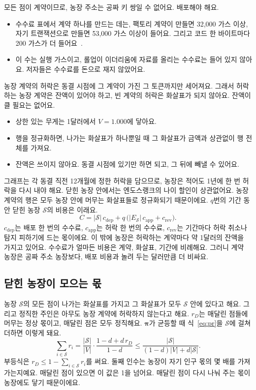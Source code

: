 모든 점이 계약이므로, 농장 주소는 공짜 키 쌍일 수 없어요. 배포해야 해요.
\begin{itemize}
\item 수수료 표에서 계약 하나를 만드는 데는, 팩토리 계약이 만들면 32,000 가스 이상, 자기 트랜잭션으로 만들면 53,000 가스 이상이 들어요. 그리고 코드 한 바이트마다 200 가스가 더 들어요~\cite{wood2025yellowpaper}.
\item 이 수는 실행 가스이고, 롤업이 이더리움에 자료를 올리는 수수료는 들어 있지 않아요. 저자들은 수수료를 돈으로 재지 않았어요.
\end{itemize}
농장 계약의 허락은 동결 시점에 그 계약이 가진 그 토큰까지만 세어져요. 그래서 허락하는 농장 계약은 잔액이 있어야 하고, 빈 계약의 허락은 화살표가 되지 않아요. 잔액이 클 필요는 없어요.
\begin{itemize}
\item 상한 있는 무게는 1달러에서 $V=1.000$에 닿아요.
\item 행을 정규화하면, 나가는 화살표가 하나뿐일 때 그 화살표가 금액과 상관없이 행 전체를 가져요.
\item 잔액은 쓰이지 않아요. 동결 시점에 있기만 하면 되고, 그 뒤에 빼낼 수 있어요.
\end{itemize}
그래프는 각 동결 직전 12개월에 정한 허락을 담으므로, 농장은 적어도 1년에 한 번 허락을 다시 내야 해요. 닫힌 농장 안에서는 엔도스랭크의 나이 할인이 상관없어요. 농장 계약의 행은 모두 농장 안에 머무는 화살표들로 정규화되기 때문이에요. $q$번의 기간 동안 닫힌 농장 $\mathcal S$의 비용은 이래요.
\begin{equation}
C=|\mathcal S|\,c_{\text{dep}}+q\,\bigl(|E_{\mathcal S}|\,c_{\text{app}}+c_{\text{rev}}\bigr).
\label{eq:cost}
\end{equation}
$c_{\text{dep}}$는 배포 한 번의 수수료, $c_{\text{app}}$는 허락 한 번의 수수료, $c_{\text{rev}}$는 기간마다 허락 취소나 탐지 피하기에 드는 몫이에요. 이 밖에 농장은 허락하는 계약마다 약 1달러의 잔액을 가지고 있어요. 수수료가 얼마든 비용은 계약, 화살표, 기간에 비례해요. 그러니 계약 농장은 공짜 주소 농장보다, 배포 비용과 놀려 두는 달러만큼 더 비싸요.

\subsection{닫힌 농장이 모으는 몫}

농장 $\mathcal S$의 모든 점이 나가는 화살표를 가지고 그 화살표가 모두 $\mathcal S$ 안에 있다고 해요. 그리고 정직한 주인은 아무도 농장 계약에 허락하지 않는다고 해요. $r_D$는 매달린 점들에 머무는 정상 몫이고, 매달린 점은 모두 정직해요. $\boldsymbol\pi$가 균등할 때 식~\eqref{eq:pr}을 $\mathcal S$에 걸쳐 더하면 이렇게 돼요.
\begin{equation}
\sum_{i\in\mathcal S} r_i=\frac{|\mathcal S|}{|V|}\cdot\frac{1-d+d\,r_D}{1-d}\le\frac{|\mathcal S|}{(1-d)|V|+d|\mathcal S|}.
\label{eq:farm}
\end{equation}
부등식은 $r_D\le 1-\sum_{i\in\mathcal S}r_i$를 써요. 둘째 인수는 농장이 자기 인구 몫의 몇 배를 가져가는지예요. 매달린 점이 있으면 이 값은 1을 넘어요. 매달린 점이 다시 나눠 주는 몫이 농장에도 닿기 때문이에요.

